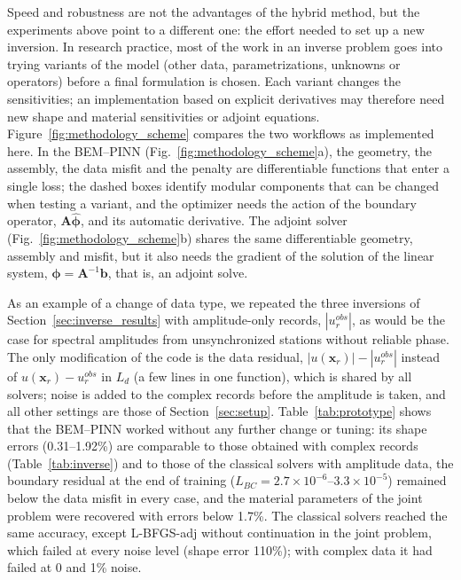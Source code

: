 \documentclass[11pt,twoside]{article}
\begin{document}
Speed and robustness are not the advantages of the hybrid method, but the experiments above point to a different one: the effort needed to set up a new inversion. In research practice, most of the work in an inverse problem goes into trying variants of the model (other data, parametrizations, unknowns or operators) before a final formulation is chosen. Each variant changes the sensitivities; an implementation based on explicit derivatives may therefore need new shape and material sensitivities or adjoint equations. Figure~\ref{fig:methodology_scheme} compares the two workflows as implemented here. In the BEM--PINN (Fig.~\ref{fig:methodology_scheme}a), the geometry, the assembly, the data misfit and the penalty are differentiable functions that enter a single loss; the dashed boxes identify modular components that can be changed when testing a variant, and the optimizer needs the action of the boundary operator, $\mathbf{A}\hat{\boldsymbol{\phi}}$, and its automatic derivative. The adjoint solver (Fig.~\ref{fig:methodology_scheme}b) shares the same differentiable geometry, assembly and misfit, but it also needs the gradient of the solution of the linear system, $\boldsymbol{\phi}=\mathbf{A}^{-1}\mathbf{b}$, that is, an adjoint solve.

As an example of a change of data type, we repeated the three inversions of Section~\ref{sec:inverse_results} with amplitude-only records, $|u^{obs}_r|$, as would be the case for spectral amplitudes from unsynchronized stations without reliable phase. The only modification of the code is the data residual, $|u(\mathbf{x}_r)|-|u^{obs}_r|$ instead of $u(\mathbf{x}_r)-u^{obs}_r$ in $L_d$ (a few lines in one function), which is shared by all solvers; noise is added to the complex records before the amplitude is taken, and all other settings are those of Section~\ref{sec:setup}. Table~\ref{tab:prototype} shows that the BEM--PINN worked without any further change or tuning: its shape errors (0.31--1.92\%) are comparable to those obtained with complex records (Table~\ref{tab:inverse}) and to those of the classical solvers with amplitude data, the boundary residual at the end of training ($L_{BC}=2.7\times10^{-6}$--$3.3\times10^{-5}$) remained below the data misfit in every case, and the material parameters of the joint problem were recovered with errors below 1.7\%. The classical solvers reached the same accuracy, except L-BFGS-adj without continuation in the joint problem, which failed at every noise level (shape error 110\%); with complex data it had failed at 0 and 1\% noise.
\end{document}
